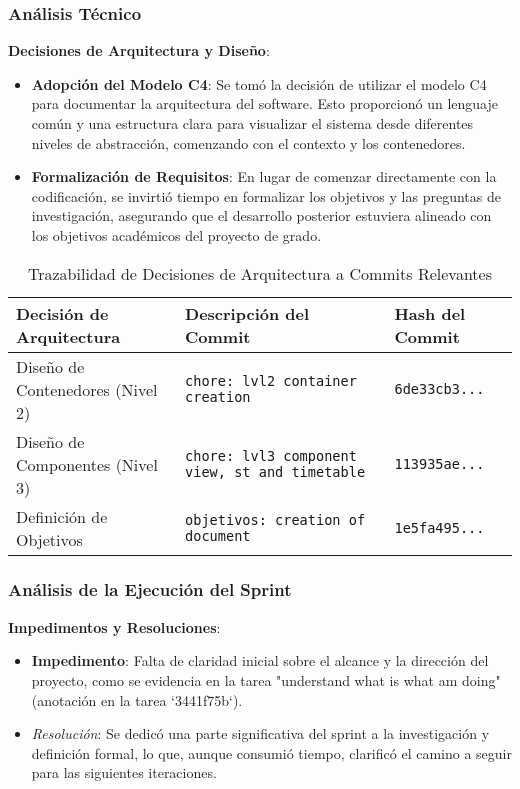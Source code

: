 \subsubsection{Análisis Técnico}

\textbf{Decisiones de Arquitectura y Diseño}:
\begin{itemize}
    \item \textbf{Adopción del Modelo C4}: Se tomó la decisión de utilizar el modelo C4 para documentar la arquitectura del software. Esto proporcionó un lenguaje común y una estructura clara para visualizar el sistema desde diferentes niveles de abstracción, comenzando con el contexto y los contenedores.
    \item \textbf{Formalización de Requisitos}: En lugar de comenzar directamente con la codificación, se invirtió tiempo en formalizar los objetivos y las preguntas de investigación, asegurando que el desarrollo posterior estuviera alineado con los objetivos académicos del proyecto de grado.
\end{itemize}

\begin{table}[H]
    \caption{Trazabilidad de Decisiones de Arquitectura a Commits Relevantes}
    \label{tab:sprint-1-commit-traceability}
    \begin{tabularx}{\textwidth}{@{}lXl@{}}
        \toprule
        \textbf{Decisión de Arquitectura} & \textbf{Descripción del Commit} & \textbf{Hash del Commit} \\
        \midrule
        Diseño de Contenedores (Nivel 2) & \texttt{chore: lvl2 container creation} & \texttt{6de33cb3...} \\
        Diseño de Componentes (Nivel 3) & \texttt{chore: lvl3 component view, st and timetable} & \texttt{113935ae...} \\
        Definición de Objetivos & \texttt{objetivos: creation of document} & \texttt{1e5fa495...} \\
        \bottomrule
    \end{tabularx}
\end{table}

\subsubsection{Análisis de la Ejecución del Sprint}

\textbf{Impedimentos y Resoluciones}:
\begin{itemize}
    \item \textbf{Impedimento}: Falta de claridad inicial sobre el alcance y la dirección del proyecto, como se evidencia en la tarea "understand what is what am doing" (anotación en la tarea `3441f75b`).
    \item \textit{Resolución}: Se dedicó una parte significativa del sprint a la investigación y definición formal, lo que, aunque consumió tiempo, clarificó el camino a seguir para las siguientes iteraciones.
\end{itemize}

